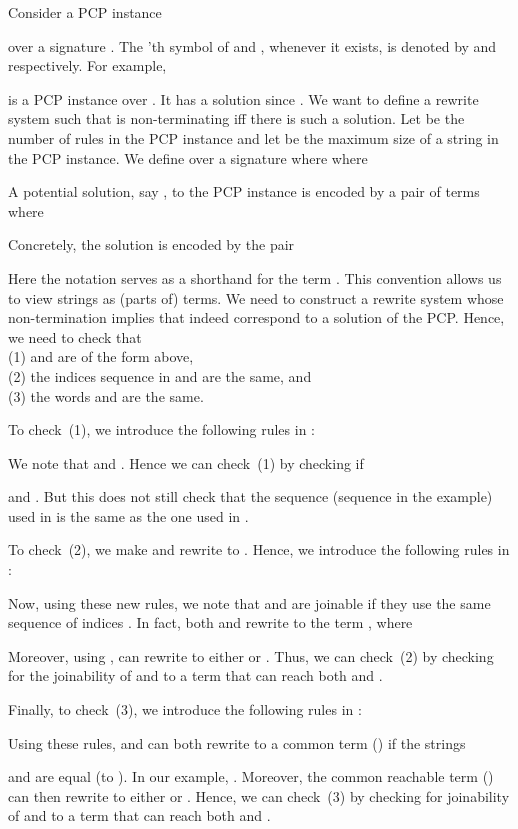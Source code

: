 \documentclass{LMCS}
\theoremstyle{plain}
\begin{document}
Consider a PCP instance

over a signature . 
The 'th symbol of  and , whenever it exists,
is denoted by  and  respectively.
For example, 
 
is a PCP instance over .  It has a
solution  since .
We want to define a rewrite system  such that  is non-terminating
iff there is such a solution.  
Let  be the number of rules in the PCP instance
and let  be the maximum size of a string in the PCP instance.
We define  over a signature  where
where

A potential solution, say , to the PCP instance is encoded
by a pair of terms  where

Concretely, the solution  is encoded by the pair

Here the notation 
 serves as a shorthand for the term
. 
This convention allows us to view strings as (parts of) terms.
We need to construct a rewrite system  whose non-termination 
implies that  indeed correspond
to a solution of the PCP.  Hence, we need to check that
\\
(1)  and  are of the form above,
\\
(2) the indices sequence  
in  and  are the same, and
\\
(3) the words  and  are the same.

To check~(1), we introduce the following rules in :

We note that  and
.
Hence we can check~(1) by checking if 

and
.
But this does not still check that the sequence 
(sequence  in the example) used
in  is the same as the one used in .

To check~(2), we make  and  rewrite to
.  Hence, we introduce the following rules in :

Now, using these new rules,
we note that  and  are joinable if
they use the same sequence of indices .
In fact, both  and  rewrite to the term
, where

Moreover, using , 
 can rewrite to either  or .
Thus, we can check~(2) by checking for the joinability of 
 and  to a term that can reach both  and .

Finally, to check~(3), we introduce the following rules in :

Using these rules,
 and  can both rewrite to a common term 
() if
the strings 
 
and
 are equal (to ).
In our example, .
Moreover, the common reachable term () can then rewrite to either  or .
Hence, we can check~(3) by checking for joinability of  and
 to a term that can reach both  and .
\end{document}
